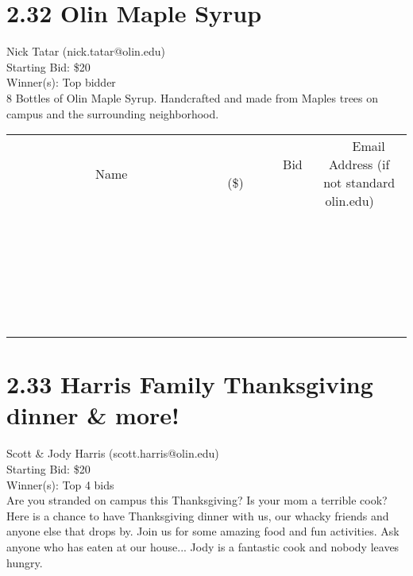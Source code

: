 \documentclass[11pt]{article}
\begin{document}
\section*{2.32 Olin Maple Syrup}
Nick Tatar (nick.tatar@olin.edu) \\
Starting Bid: \$20 \\
Winner(s): 
Top bidder \\
8 Bottles of Olin Maple Syrup. Handcrafted and made from Maples trees on campus and the surrounding neighborhood. \\[6ex]
\begin{tabular}{c c c}
~~~~~~~~~~~~~Name~~~~~~~~~~~~~ & ~~~~~~~~~Bid (\$)~~~~~~~~~ & ~~~Email Address (if not standard olin.edu)~~~ \\
 & & \\
\hline
 & & \\
\hline
 & & \\
\hline
 & & \\
\hline
 & & \\
\hline
 & & \\
\hline
 & & \\
\hline
 & & \\
\hline
 & & \\
\hline
 & & \\
\hline
 & & \\
\hline
 & & \\
\hline
 & & \\
\hline
 & & \\
\hline
 & & \\
\hline
 & & \\
\hline
 & & \\
\hline
 & & \\
\hline
 & & \\
\hline
 & & \\
\hline
 & & \\
\hline
 & & \\
\hline
 & & \\
\hline
 & & \\
\hline
 & & \\
\hline
 & & \\
\hline
\end{tabular}
\clearpage
\section*{2.33 Harris Family Thanksgiving dinner \& more!}
Scott \& Jody Harris (scott.harris@olin.edu) \\
Starting Bid: \$20 \\
Winner(s): 
Top 4 bids \\
Are you stranded on campus this Thanksgiving? Is your mom a terrible cook? Here is a chance to have Thanksgiving dinner with us, our whacky friends and anyone else that drops by. Join us for some amazing food and fun activities. Ask anyone who has eaten at our house... Jody is a fantastic cook and nobody leaves hungry.
\end{document}
